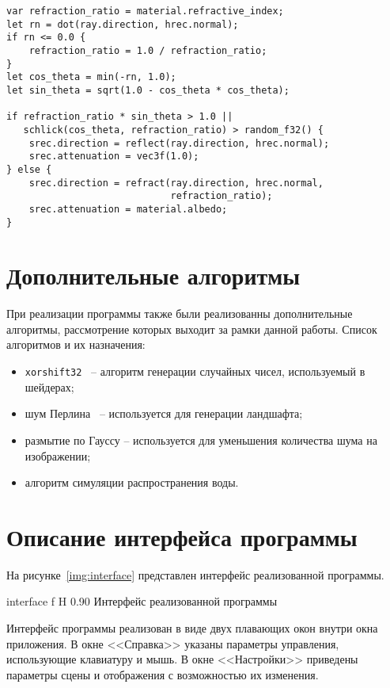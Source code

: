 \begin{lstlisting}[caption={Реализация материала воды},label={lst:water},frame=single]
var refraction_ratio = material.refractive_index;
let rn = dot(ray.direction, hrec.normal);
if rn <= 0.0 {
    refraction_ratio = 1.0 / refraction_ratio;
}
let cos_theta = min(-rn, 1.0);
let sin_theta = sqrt(1.0 - cos_theta * cos_theta);

if refraction_ratio * sin_theta > 1.0 || 
   schlick(cos_theta, refraction_ratio) > random_f32() {
    srec.direction = reflect(ray.direction, hrec.normal);
    srec.attenuation = vec3f(1.0);
} else {
    srec.direction = refract(ray.direction, hrec.normal, 
                             refraction_ratio);
    srec.attenuation = material.albedo;
}
\end{lstlisting}

\section{Дополнительные алгоритмы}

При реализации программы также были реализованны дополнительные алгоритмы, рассмотрение 
которых выходит за рамки данной работы. Список алгоритмов и их назначения:
\begin{itemize}
    \item \verb|xorshift32|~\cite{xorshift} -- алгоритм генерации случайных чисел, используемый в шейдерах;
    \item шум Перлина~\cite{perlin} -- используется для генерации ландшафта;
    \item размытие по Гауссу -- используется для уменьшения количества шума на изображении;
    \item алгоритм симуляции распространения воды.
\end{itemize}

\section{Описание интерфейса программы}

На рисунке~\ref{img:interface} представлен интерфейс реализованной программы.

    {interface}
    {f}
    {H}
    {0.90\textwidth}
    {Интерфейс реализованной программы}

Интерфейс программы реализован в виде двух плавающих окон внутри окна приложения.
В окне <<Справка>> указаны параметры управления, использующие клавиатуру и мышь.
В окне <<Настройки>> приведены параметры сцены и отображения с возможностью их изменения.

